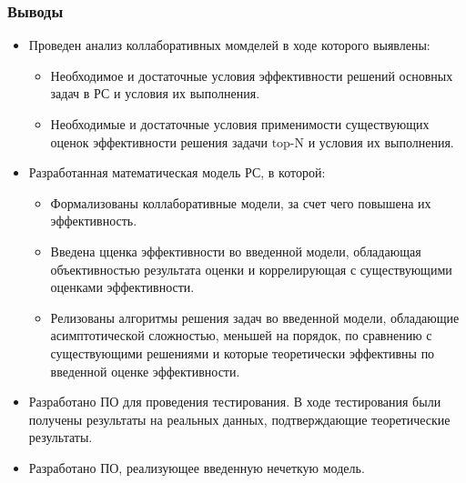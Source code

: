 \documentclass[10pt,xcolor={usenames,dvipsnames}]{beamer}
\theoremstyle{break}
\def\top{\text{top-N}}
\begin{document}
\begin{frame}
  \frametitle{Выводы}
  \scriptsize{
  \begin{itemize}
  \item Проведен анализ коллаборативных момделей в ходе которого выявлены:
    \begin{itemize}
    \item Необходимое и достаточные условия эффективности решений основных задач в РС и условия их выполнения.
    \item Необходимые и достаточные условия применимости существующих оценок эффективности решения задачи $\top$ и условия их выполнения.
    \end{itemize}
  \item Разработанная математическая модель РС, в которой:
        \begin{itemize}
        \item Формализованы коллаборативные модели, за счет чего повышена их эффективность.
        \item Введена цценка эффективности во введенной модели, обладающая объективностью результата оценки и коррелирующая с существующими оценками эффективности.
        \item Релизованы алгоритмы решения задач во введенной модели, обладающие асимптотической сложностью, меньшей на порядок, по сравнению 
          с существующими решениями и которые теоретически эффективны по введенной оценке эффективности.
        \end{itemize}
  \item Разработано ПО для проведения тестирования. В ходе тестирования были получены результаты на реальных данных, подтверждающие теоретические результаты.
  \item Разработано ПО, реализующее введенную нечеткую модель.
  \end{itemize}
}
\end{frame}
\end{document}

